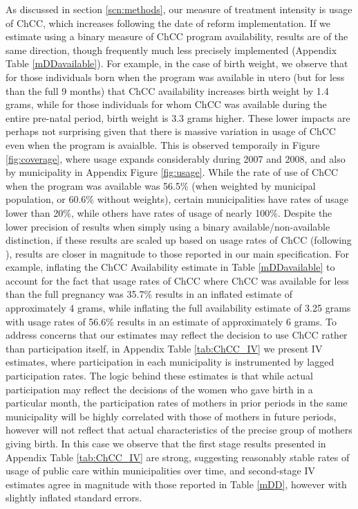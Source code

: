 \documentclass[12pt]{article}
\begin{document}
\begin{spacing}{1.4}
As discussed in section \ref{scn:methods}, our measure of treatment
intensity is usage of ChCC, which increases following the date of
reform implementation.  If we estimate using a binary measure of
ChCC program availability, results are of the same direction, though
frequently much less precisely implemented (Appendix Table
\ref{mDDavailable}).  For example, in the case of birth weight,
we observe that for those individuals born when the program was
available in utero (but for less than the full 9 months) that ChCC
availability increases birth weight by 1.4 grams, while for those
individuals for whom ChCC was available during the entire pre-natal
period, birth weight is 3.3 grams higher.  These lower impacts are
perhaps not surprising given that there is massive variation in usage
of ChCC even when the program is avaialble.  This is observed
temporaily in Figure \ref{fig:coverage}, where usage expands
considerably during 2007 and 2008, and also by municipality in Appendix
Figure \ref{fig:usage}.  While the rate of use of ChCC when the
program was available was 56.5\% (when weighted by municipal population,
or 60.6\% without weights), certain municipalities have rates of
usage lower than 20\%, while others have rates of usage of nearly
100\%.  Despite the lower precision of results when simply using
a binary available/non-available distinction, if these results are
scaled up based on usage rates of ChCC (following \citet{Almondetal2011}),
results are closer in magnitude to those reported in our main
specification. For example, inflating the ChCC Availability estimate
in Table \ref{mDDavailable} to account for the fact that usage rates
of ChCC where ChCC was available for less than the full pregnancy
was 35.7\% results in an inflated estimate of approximately 4 grams,
while inflating the full availability estimate of 3.25 grams with
usage rates of 56.6\% results in an estimate of approximately 6
grams.  To address concerns that our estimates may reflect the
decision to use ChCC rather than participation itself, in Appendix
Table \ref{tab:ChCC_IV} we present IV estimates, where participation
in each municipality is instrumented by lagged participation rates.
The logic behind these estimates is that while actual participation
may reflect the decisions of the women who gave birth in a particular
month, the participation rates of mothers in prior periods in the
same municipality will be highly correlated with those of mothers
in future periods, however will not reflect that actual characteristics
of the precise group of mothers giving birth.  In this case we observe
that the first stage results presented in Appendix Table \ref{tab:ChCC_IV}
are strong, suggesting reasonably stable rates of usage of public care
within municipalities over time, and second-stage IV estimates agree
in magnitude with those reported in Table \ref{mDD}, however with
slightly inflated standard errors.


\end{spacing}
\end{document}
